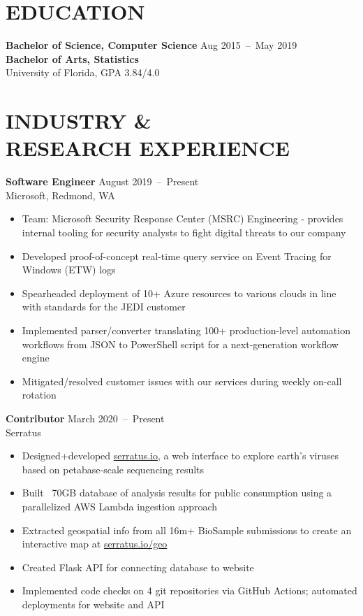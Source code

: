 \documentclass[line,resmargin]{res}
\begin{document}
\address{\href{mailto:victor@victorl.in}{victor@victorl.in} $|$
         \href{https://victorl.in/}{https://victorl.in/}}

\begin{resume}

\section{EDUCATION}
    \textbf{Bachelor of Science, Computer Science}    \hfill Aug 2015~--~May 2019 \\
    \textbf{Bachelor of Arts, Statistics} \\
    University of Florida, GPA 3.84/4.0

\section{INDUSTRY \& \\ RESEARCH EXPERIENCE}
    \textbf{Software Engineer}    \hfill August 2019~--~Present \\
    Microsoft, Redmond, WA
    \begin{itemize}  \itemsep -2pt
        \item Team: Microsoft Security Response Center (MSRC) Engineering - provides internal tooling for security analysts to fight digital threats to our company
        \item Developed proof-of-concept real-time query service on Event Tracing for Windows (ETW) logs
        \item Spearheaded deployment of 10+ Azure resources to various clouds in line with standards for the JEDI customer
        \item Implemented parser/converter translating 100+ production-level automation workflows from JSON to PowerShell script for a next-generation workflow engine
        \item Mitigated/resolved customer issues with our services during weekly on-call rotation
    \end{itemize}

    \textbf{Contributor}    \hfill March 2020~--~Present \\
    Serratus
    \begin{itemize}  \itemsep -2pt
        \item Designed+developed \href{https://serratus.io/}{serratus.io}, a web interface to explore earth's viruses based on petabase-scale sequencing results
        \item Built ~70GB database of analysis results for public consumption using a parallelized AWS Lambda ingestion approach
        \item Extracted geospatial info from all 16m+ BioSample submissions to create an interactive map at \href{https://serratus.io/geo}{serratus.io/geo}
        \item Created Flask API for connecting database to website
        \item Implemented code checks on 4 git repositories via GitHub Actions; automated deployments for website and API
    \end{itemize}


\end{resume}
\end{document}
